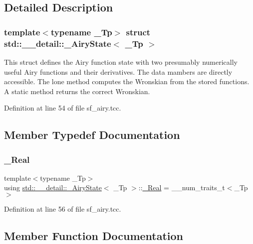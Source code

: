 \subsection{Detailed Description}
\subsubsection*{template$<$typename \+\_\+\+Tp$>$\newline
struct std\+::\+\_\+\+\_\+detail\+::\+\_\+\+Airy\+State$<$ \+\_\+\+Tp $>$}

This struct defines the Airy function state with two presumably numerically useful Airy functions and their derivatives. The data mambers are directly accessible. The lone method computes the Wronskian from the stored functions. A static method returns the correct Wronskian. 

Definition at line 54 of file sf\+\_\+airy.\+tcc.



\subsection{Member Typedef Documentation}
\mbox{\label{structstd_1_1____detail_1_1__AiryState_ac18d07c685cbffed6173532d5f0c0cc9}} 
\subsubsection{\texorpdfstring{\+\_\+\+Real}{\_Real}}
{\footnotesize\ttfamily template$<$typename \+\_\+\+Tp$>$ \\
using \hyperlink{structstd_1_1____detail_1_1__AiryState}{std\+::\+\_\+\+\_\+detail\+::\+\_\+\+Airy\+State}$<$ \+\_\+\+Tp $>$\+::\hyperlink{structstd_1_1____detail_1_1__AiryState_ac18d07c685cbffed6173532d5f0c0cc9}{\+\_\+\+Real} =  \+\_\+\+\_\+num\+\_\+traits\+\_\+t$<$\+\_\+\+Tp$>$}



Definition at line 56 of file sf\+\_\+airy.\+tcc.



\subsection{Member Function Documentation}
\mbox{\label{structstd_1_1____detail_1_1__AiryState_a6c519145b38f24b2dab705fbc23f49d6}} 

